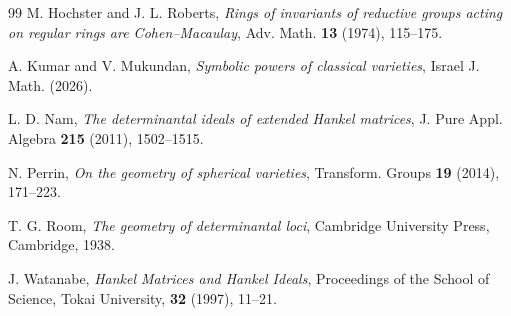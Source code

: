 \documentclass[11pt,reqno]{amsart}
\numberwithin{equation}{subsection}
\theoremstyle{definition}
\theoremstyle{remark}
\begin{document}
\begin{thebibliography}{99}
M. Hochster and J. L. Roberts,
\emph{Rings of invariants of reductive groups acting on regular
rings are Cohen--Macaulay},
Adv. Math. \textbf{13} (1974), 115--175.

 A. Kumar and V. Mukundan,
\emph{Symbolic powers of classical varieties}, Israel J. Math. (2026).%

L. D. Nam,
\emph{The determinantal ideals of extended Hankel matrices},
J. Pure Appl. Algebra \textbf{215} (2011), 1502--1515.

N. Perrin,
\emph{On the geometry of spherical varieties},
Transform. Groups \textbf{19} (2014), 171--223.

T. G. Room, 
\emph{The geometry of determinantal loci}, Cambridge University Press, Cambridge, 1938.

J. Watanabe,
\emph{Hankel Matrices and Hankel Ideals}, 
 Proceedings of the School of Science, Tokai University, \textbf{32} (1997), 11--21.


\end{thebibliography}
\end{document}
